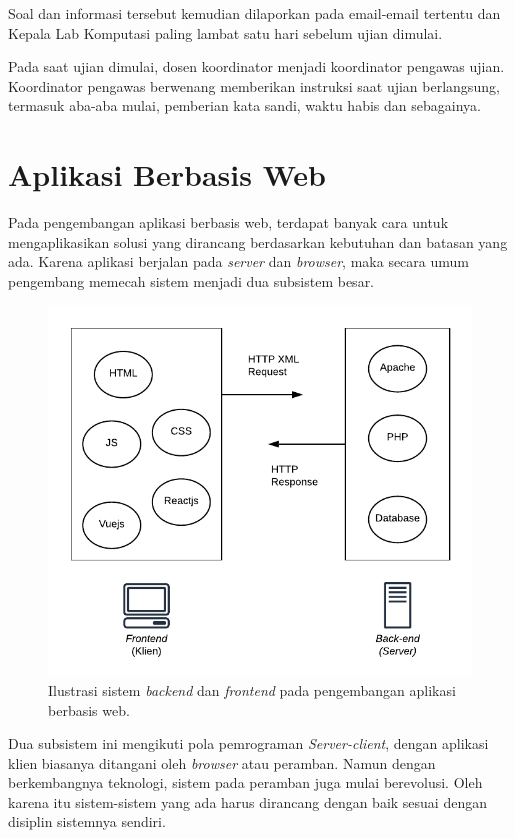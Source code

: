     Soal dan informasi tersebut kemudian dilaporkan pada email-email tertentu
    dan Kepala Lab Komputasi paling lambat satu hari sebelum ujian dimulai.

    Pada saat ujian dimulai, dosen koordinator menjadi koordinator pengawas
    ujian. Koordinator pengawas berwenang memberikan instruksi saat ujian
    berlangsung, termasuk aba-aba mulai, pemberian kata sandi, waktu habis dan
    sebagainya.

\section{Aplikasi Berbasis Web}
    Pada pengembangan aplikasi berbasis web, terdapat
    banyak cara untuk mengaplikasikan solusi yang dirancang berdasarkan
    kebutuhan dan batasan yang ada. Karena
    aplikasi berjalan pada \textit{server} dan \textit{browser}, maka
    secara umum pengembang memecah sistem menjadi dua subsistem besar.
    
    \begin{figure}
        \centering
        \includegraphics{Gambar/Illustration - frontend-backend.pdf}
        \caption{Ilustrasi sistem \textit{backend} dan \textit{frontend} pada pengembangan 
            aplikasi berbasis web.}
        \label{fig:illust-web}
    \end{figure}
    
    Dua subsistem ini mengikuti pola pemrograman \textit{Server-client}, dengan
    aplikasi klien biasanya ditangani oleh \textit{browser} atau peramban. Namun
    dengan berkembangnya teknologi, sistem pada peramban juga mulai berevolusi.
    Oleh karena itu sistem-sistem yang ada harus dirancang dengan baik sesuai
    dengan disiplin sistemnya sendiri.
    
